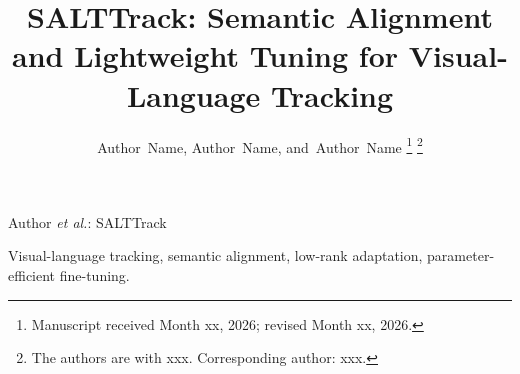 \documentclass[lettersize,journal]{IEEEtran}
\begin{document}
\title{SALTTrack: Semantic Alignment and Lightweight Tuning for Visual-Language Tracking}

\author{Author~Name,
        Author~Name,
        and~Author~Name%
\thanks{Manuscript received Month xx, 2026; revised Month xx, 2026.}
\thanks{The authors are with xxx. Corresponding author: xxx.}}

%
{Author \MakeLowercase{\textit{et al.}}: SALTTrack}

\maketitle



\begin{IEEEkeywords}
Visual-language tracking, semantic alignment, low-rank adaptation, parameter-efficient fine-tuning.
\end{IEEEkeywords}









\end{document}
